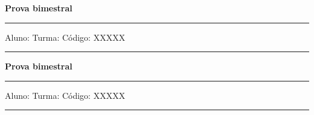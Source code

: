 \documentclass[addpoints]{exam}
\begin{document}
        
\begin{center}
	{\bf \Huge Prova bimestral}
	\vspace{1cm} \hrule \vspace{0.5cm}
	Aluno: \hfill Turma: \hfill Código: XXXXX
	\vspace{0.5cm} \hrule \vspace{0.5cm}
\end{center}
        \begin{questions}
\linebreak\linebreak
\begin{oneparchoices}
\end{oneparchoices}
\linebreak\linebreak
\begin{oneparchoices}
\end{oneparchoices}
\end{questions}
\newpage
\begin{center}
	{\bf \Huge Prova bimestral}
	\vspace{1cm} \hrule \vspace{0.5cm}
	Aluno: \hfill Turma: \hfill Código: XXXXX
	\vspace{0.5cm} \hrule \vspace{0.5cm}
\end{center}
        \begin{questions}
\linebreak\linebreak
\begin{oneparchoices}
\end{oneparchoices}
\linebreak\linebreak
\begin{oneparchoices}
\end{oneparchoices}
\end{questions}
\newpage
\end{document}
